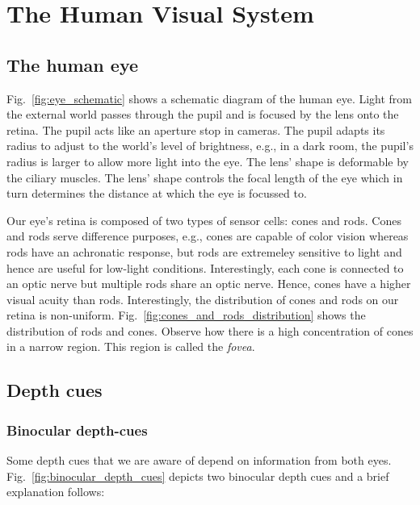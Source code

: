 \section{The Human Visual System}
\label{sec:background:hvs}
\subsection{The human eye}



Fig.~\ref{fig:eye_schematic} shows a schematic diagram of the human eye. 
Light from the external world passes through the pupil and is focused by the lens onto the retina. 
The pupil acts like an aperture stop in cameras. 
The pupil adapts its radius to adjust to the world’s level of brightness, e.g., in a dark room, the pupil’s radius is larger to allow more light into the eye. 
The lens’ shape is deformable by the ciliary muscles. 
The lens’ shape controls the focal length of the eye which in turn determines the distance at which the eye is focussed to.



Our eye’s retina is composed of two types of sensor cells: cones and rods. 
Cones and rods serve difference purposes, e.g., cones are capable of color vision whereas rods have an achronatic response, but rods are extremeley sensitive to light and hence are useful for low-light conditions.
Interestingly, each cone is connected to an optic nerve but multiple rods share an optic nerve. 
Hence, cones have a higher visual acuity than rods. 
Interestingly, the distribution of cones and rods on our retina is non-uniform. 
Fig.~\ref{fig:cones_and_rods_distribution} shows the distribution of rods and cones. 
Observe how there is a high concentration of cones in a narrow region. This region is called the \emph{fovea}.

\subsection{Depth cues}
\label{sec:background:depth_cues}
\subsubsection{Binocular depth-cues}
Some depth cues that we are aware of depend on information from both eyes. Fig.~\ref{fig:binocular_depth_cues} depicts two binocular depth cues and a brief explanation follows:

